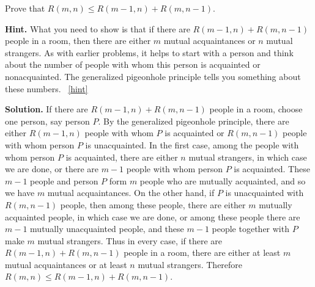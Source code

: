 \documentclass{book}
\begin{document}
\setcounter{project}{52}
\addtocounter{project}{-1}
\begin{activity}[]\label{Ramseyrecurrence}
\hypertarget{p-435}{}%
Prove that \(R(m,n)\le R(m-1,n) + R(m,n-1)\).%
\par\smallskip%
\noindent\textbf{Hint.}\hypertarget{hint-22}{}\quad%
\hypertarget{p-436}{}%
What you need to show is that if there are \(R(m - 1, n) + R(m, n - 1)\) people in a room, then there are either \(m\) mutual acquaintances or \(n\) mutual strangers. As with earlier problems, it helps to start with a person and think about the number of people with whom this person is acquainted or nonacquainted. The generalized pigeonhole principle tells you something about these numbers.%
~\hfill{\tiny\hyperlink{a-52}{[hint]}\hypertarget{q-52}{}}\par\smallskip%
\noindent\textbf{Solution.}\hypertarget{solution-39}{}\quad%
\hypertarget{p-437}{}%
If there are \(R(m-1,n) +R(m,n-1)\) people in a room, choose one person, say person \(P\). By the generalized pigeonhole principle, there are either \(R(m-1,n)\) people with whom \(P\) is acquainted or \(R(m,n-1)\) people with whom person \(P\) is unacquainted. In the first case, among the people with whom person \(P\) is acquainted, there are either \(n\) mutual strangers, in which case we are done, or there are \(m-1\) people with whom person \(P\) is acquainted. These \(m-1\) people and person \(P\) form \(m\) people who are mutually acquainted, and so we have \(m\) mutual acquaintances. On the other hand, if \(P\) is unacquainted with \(R(m,n-1)\) people, then among these people, there are either \(m\) mutually acquainted people, in which case we are done, or among these people there are \(m-1\) mutually unacquainted people, and these \(m-1\) people together with \(P\) make \(m\) mutual strangers. Thus in every case, if there are \(R(m-1,n)+R(m,n-1)\) people in a room, there are either at least \(m\) mutual acquaintances or at least \(n\) mutual strangers. Therefore \(R(m,n)\le R(m-1,n)+R(m,n-1)\).%
\end{activity}

\clearpage
\end{document}
